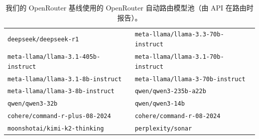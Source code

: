 \begin{table}[t]
\begin{tabular}{ll}
\texttt{deepseek/deepseek-r1} & \texttt{meta-llama/llama-3.3-70b-instruct} \\
\texttt{meta-llama/llama-3.1-405b-instruct} & \texttt{meta-llama/llama-3.1-70b-instruct} \\
\texttt{meta-llama/llama-3.1-8b-instruct} & \texttt{meta-llama/llama-3-70b-instruct} \\
\texttt{meta-llama/llama-3-8b-instruct} & \texttt{qwen/qwen3-235b-a22b} \\
\texttt{qwen/qwen3-32b} & \texttt{qwen/qwen3-14b} \\
\texttt{cohere/command-r-plus-08-2024} & \texttt{cohere/command-r-08-2024} \\
\texttt{moonshotai/kimi-k2-thinking} & \texttt{perplexity/sonar} \\
\bottomrule
\end{tabular}
\caption{我们的 OpenRouter 基线使用的 OpenRouter 自动路由模型池（由 API 在路由时报告）。}
\label{tab:openrouter_pool}
\end{table}

